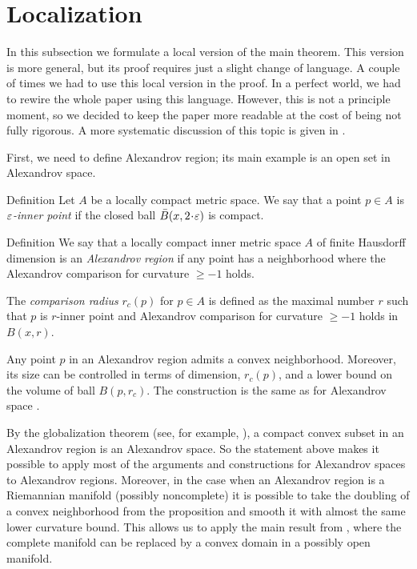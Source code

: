 \section{Localization}\label{sec:local}

In this subsection we formulate a local version of the main theorem.
This version is more general, but its proof requires just a slight change of language.
A couple of times we had to use this local version in the proof.
In a perfect world, we had to rewire the whole paper using this language.
However, this is not a principle moment,
so we decided to keep the paper more readable at the cost of being not fully rigorous.
A more systematic discussion of this topic is given in \cite{LNep}.

First, we need to define Alexandrov region;
its main example is an open set in Alexandrov space.

\begin{thm}{Definition}
Let $A$ be a locally compact metric space. 
We say that a point  $p\in A$
is  \emph{ $\varepsilon$-inner point} if
the closed ball $\bar B(x,2\cdot\eps)$ is compact.
\end{thm}

\begin{thm}{Definition}
We say that a locally compact inner metric space $A$ of finite Hausdorff dimension is an \emph{Alexandrov region} if any point has a neighborhood where the Alexandrov comparison for curvature $\ge -1$ holds.

The \emph{comparison radius} $r_c(p)$ for $p\in A$ is defined as the maximal number $r$ such that $p$ is $r$-inner point and Alexandrov comparison for curvature $\ge -1$ holds in $B(x,r)$.
\end{thm}

Any point $p$ in an Alexandrov region admits a convex neighborhood.
Moreover, its size can be controlled in terms of dimension, $r_c(p)$, and a lower bound on the volume of ball $B(p,r_c)$.
The construction is the same as for Alexandrov space \cite[4.3]{perelman-petrunin}.

By the globalization theorem (see, for example, \cite{AKP}), a compact convex subset in an Alexandrov region is an Alexandrov space.
So the statement above makes it possible to apply most of the arguments and constructions for Alexandrov spaces to Alexandrov regions. 
Moreover, in the case when an Alexandrov region is a Riemannian manifold (possibly noncomplete) it is possible to take the doubling of a convex neighborhood from the proposition and smooth it with almost the same lower curvature bound.
This allows us to apply the main result from \cite{petrunin-SC}, where the complete manifold can be replaced by a convex domain in a possibly open manifold. 

